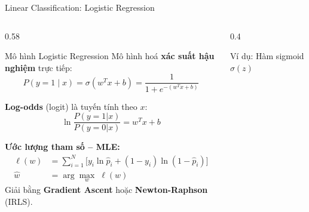 
\begin{frame}[shrink=40]{Linear Classification: Logistic Regression}
    \begin{columns}[T]
        \begin{column}{0.58\textwidth}
            \begin{block}{Mô hình Logistic Regression}
                Mô hình hoá \textbf{xác suất hậu nghiệm} trực tiếp:
                $$ P(y = 1 \mid x) = \sigma(w^Tx + b) = \frac{1}{1 + e^{-(w^Tx + b)}} $$

                \vspace{0.2cm}
                \textbf{Log-odds} (logit) là tuyến tính theo $x$:
                $$ \ln\frac{P(y=1|x)}{P(y=0|x)} = w^Tx + b $$

                \vspace{0.2cm}
                \textbf{Ước lượng tham số -- MLE:}
                \begin{align*}
                    \ell(w) &= \sum_{i=1}^{N} \bigl[y_i \ln \hat{p}_i + (1-y_i)\ln(1-\hat{p}_i)\bigr] \\
                    \hat{w} &= \arg\max_w \; \ell(w)
                \end{align*}
                Giải bằng \textbf{Gradient Ascent} hoặc \textbf{Newton-Raphson} (IRLS).
            \end{block}
        \end{column}

        \begin{column}{0.4\textwidth}
            \begin{exampleblock}{Ví dụ: Hàm sigmoid $\sigma(z)$}
                \begin{center}
                \end{center}
            \end{exampleblock}


\end{column}
\end{columns}
\end{frame}

